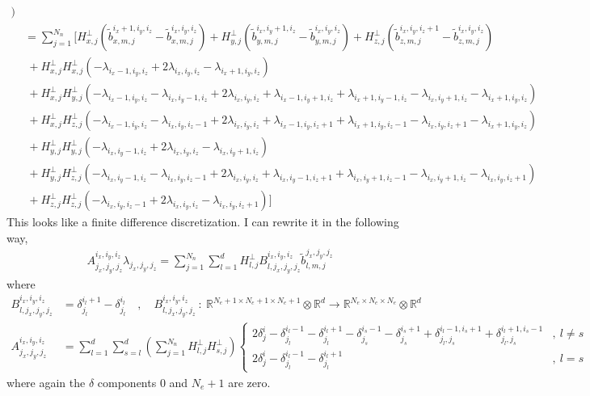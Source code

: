 \documentclass[12pt,a4paper]{article}
\begin{document}
\begin{align*}
 \Big) \\
 &=  \sum_{j=1}^{N_n} \Big[ H^\bot_{x,j} \left( \tilde{b}_{x,m,j}^{i_x+1,i_y,i_z} - \tilde{b}_{x,m,j}^{i_x,i_y,i_z} \right) + H^\bot_{y,j} \left( \tilde{b}_{y,m,j}^{i_x,i_y+1,i_z} - \tilde{b}_{y,m,j}^{i_x,i_y,i_z} \right) + H^\bot_{z,j} \left( \tilde{b}_{z,m,j}^{i_x,i_y,i_z+1} - \tilde{b}_{z,m,j}^{i_x,i_y,i_z} \right) \\
& \ + H^\bot_{x,j}  H_{x , j}^\bot \left( -  \lambda_{i_x-1,i_y,i_z} + 2 \lambda_{i_x,i_y,i_z} -  \lambda_{i_x+1,i_y,i_z} \right) \\
& \ + H^\bot_{x,j} H_{y , j}^\bot \left(  -  \lambda_{i_x-1,i_y,i_z} - \lambda_{i_x,i_y-1,i_z} + 2  \lambda_{i_x,i_y,i_z} + \lambda_{i_x-1,i_y+1,i_z} + \lambda_{i_x+1,i_y-1,i_z}  -  \lambda_{i_x,i_y+1,i_z}    -  \lambda_{i_x+1,i_y,i_z} \right) \\
& \ + H^\bot_{x,j} H_{z , j}^\bot \left( -  \lambda_{i_x-1,i_y,i_z}   - \lambda_{i_x,i_y,i_z-1} + 2 \lambda_{i_x,i_y,i_z}  + \lambda_{i_x-1,i_y,i_z+1}  + \lambda_{i_x+1,i_y,i_z-1} -  \lambda_{i_x,i_y,i_z+1} -  \lambda_{i_x+1,i_y,i_z} \right)   \\
& \ + H^\bot_{y,j}  H_{y , j}^\bot  \left( - \lambda_{i_x,i_y-1,i_z}  +  2 \lambda_{i_x,i_y,i_z}  -  \lambda_{i_x,i_y+1,i_z} \right)  \\
& \ + H^\bot_{y,j} H_{z , j}^\bot \left(  - \lambda_{i_x,i_y-1,i_z}  - \lambda_{i_x,i_y,i_z-1} + 2 \lambda_{i_x,i_y,i_z} + \lambda_{i_x,i_y-1,i_z+1} + \lambda_{i_x,i_y+1,i_z-1} -  \lambda_{i_x,i_y+1,i_z} -  \lambda_{i_x,i_y,i_z+1}  \right) \\
& \ + H^\bot_{z,j}  H_{z , j}^\bot  \left( - \lambda_{i_x,i_y,i_z-1} +  2 \lambda_{i_x,i_y,i_z} -  \lambda_{i_x,i_y,i_z+1} \right)  \Big]
\end{align*}
This looks like a finite difference discretization. I can rewrite it in the following way,
\begin{align*}
A^{i_x,i_y,i_z}_{j_x,j_y,j_z} \lambda_{j_x,j_y,j_z} = \sum_{j=1}^{N_n} \sum_{l=1}^d H^\bot_{l,j} B^{i_x,i_y,i_z}_{l,j_x,j_y,j_z} \tilde{b}_{l,m,j}^{j_x,j_y,j_z}
\end{align*}
where
\begin{align*}
B^{i_x,i_y,i_z}_{l,j_x,j_y,j_z} &= \delta^{i_l+1}_{j_l} - \delta^{i_l}_{j_l} \quad , \quad B^{i_x,i_y,i_z}_{l,j_x,j_y,j_z} \ : \ \mathds{R}^{N_e + 1 \times N_e + 1 \times N_e + 1} \otimes \mathds{R}^d \rightarrow \mathds{R}^{N_e \times N_e \times N_e} \otimes \mathds{R}^d \\
A^{i_x,i_y,i_z}_{j_x,j_y,j_z} &= 
\sum_{l=1}^d \sum_{s=l}^d \left( \sum_{j=1}^{N_n} H^\bot_{l,j} H^\bot_{s,j} \right) \left\lbrace \begin{array}{ll}
 2 \delta_{j}^{i} -  \delta_{j_l}^{i_l-1} - \delta_{j_l}^{i_l+1} -  \delta_{j_s}^{i_s-1} - \delta_{j_s}^{i_s+1} +  \delta_{j_l,j_s}^{i_l-1,i_s+1} + \delta_{j_l,j_s}^{i_l+1,i_s-1} & , \ l \neq s \\
 2 \delta_{j}^{i} -  \delta_{j_l}^{i_l-1} - \delta_{j_l}^{i_l+1} & , \ l=s
\end{array} \right.
\end{align*}
where again the $\delta$ components $0$ and $N_e + 1$ are zero.
\end{document}
